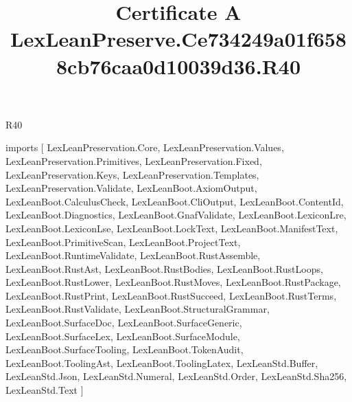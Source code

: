 \begin{lexlean}{R40}
\title{Certificate A LexLeanPreserve.Ce734249a01f6588cb76caa0d10039d36.R40}
\begin{coremodule}
imports [
  LexLeanPreservation.Core,
  LexLeanPreservation.Values,
  LexLeanPreservation.Primitives,
  LexLeanPreservation.Fixed,
  LexLeanPreservation.Keys,
  LexLeanPreservation.Templates,
  LexLeanPreservation.Validate,
  LexLeanBoot.AxiomOutput,
  LexLeanBoot.CalculusCheck,
  LexLeanBoot.CliOutput,
  LexLeanBoot.ContentId,
  LexLeanBoot.Diagnostics,
  LexLeanBoot.GnafValidate,
  LexLeanBoot.LexiconLre,
  LexLeanBoot.LexiconLse,
  LexLeanBoot.LockText,
  LexLeanBoot.ManifestText,
  LexLeanBoot.PrimitiveScan,
  LexLeanBoot.ProjectText,
  LexLeanBoot.RuntimeValidate,
  LexLeanBoot.RustAssemble,
  LexLeanBoot.RustAst,
  LexLeanBoot.RustBodies,
  LexLeanBoot.RustLoops,
  LexLeanBoot.RustLower,
  LexLeanBoot.RustMoves,
  LexLeanBoot.RustPackage,
  LexLeanBoot.RustPrint,
  LexLeanBoot.RustSucceed,
  LexLeanBoot.RustTerms,
  LexLeanBoot.RustValidate,
  LexLeanBoot.StructuralGrammar,
  LexLeanBoot.SurfaceDoc,
  LexLeanBoot.SurfaceGeneric,
  LexLeanBoot.SurfaceLex,
  LexLeanBoot.SurfaceModule,
  LexLeanBoot.SurfaceTooling,
  LexLeanBoot.TokenAudit,
  LexLeanBoot.ToolingAst,
  LexLeanBoot.ToolingLatex,
  LexLeanStd.Buffer,
  LexLeanStd.Json,
  LexLeanStd.Numeral,
  LexLeanStd.Order,
  LexLeanStd.Sha256,
  LexLeanStd.Text
]


\end{coremodule}
\end{lexlean}
